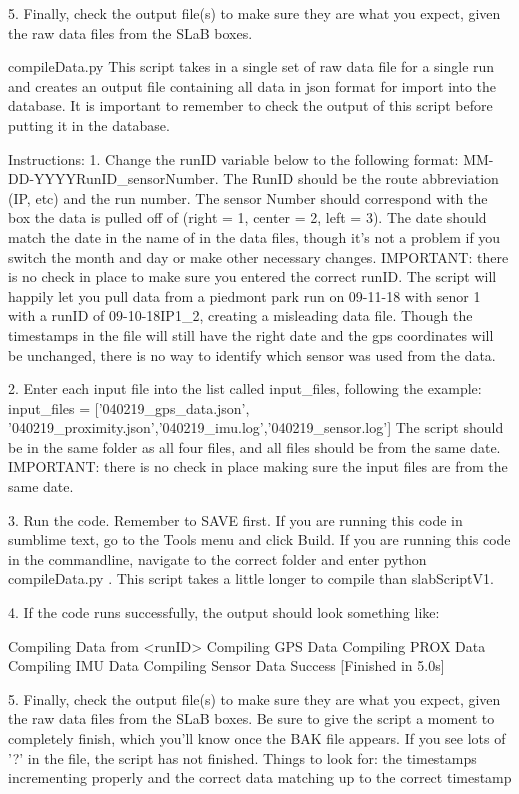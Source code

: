    5. Finally, check the output file(s) to make sure they are what you expect, given the raw data files from the SLaB
      boxes.


compileData.py
This script takes in a single set of raw data file for a single run and creates an output file containing all data in json format for import into the database. It is important to remember to check the output of this script before putting it in the database. 

Instructions:
  1. Change the runID variable below to the following format: MM-DD-YYYYRunID_sensorNumber. The RunID 
     should be the route abbreviation (IP, etc) and the run number. The sensor Number should correspond with 
     the box the data is pulled off of (right = 1, center = 2, left = 3). The date should match
     the date in the name of in the data files, though it's not a problem if you switch the month and day or make
     other necessary changes. IMPORTANT: there is no check in place to make sure you entered the correct
     runID. The script will happily let you pull data from a piedmont park run on 09-11-18 with senor 1 with a runID 
     of 09-10-18IP1_2, creating a misleading data file. Though the timestamps in the file will still have the 
     right date and the gps coordinates will be unchanged, there is no way to identify which sensor was used from the data.

  2. Enter each input file into the list called input_files, following the example:
      input_files = ['040219_gps_data.json', '040219_proximity.json','040219_imu.log','040219_sensor.log']
     The script should be in the same folder as all four files, and all files should be from the same date.
     IMPORTANT: there is no check in place making sure the input files are from the same date.

  3. Run the code. Remember to SAVE first. If you are running this code in sumblime text, go to the Tools menu and
     click Build. If you are running this code in the commandline, navigate to the correct folder and enter
     python compileData.py . This script takes a little longer to compile than slabScriptV1.

  4. If the code runs successfully, the output should look something like:

           Compiling Data from <runID>
           Compiling GPS Data
           Compiling PROX Data
           Compiling IMU Data
           Compiling Sensor Data
           Success
           [Finished in 5.0s]

  5. Finally, check the output file(s) to make sure they are what you expect, given the raw data files from the SLaB
     boxes. Be sure to give the script a moment to completely finish, which you'll know once the BAK file appears.
     If you see lots of '?' in the file, the script has not finished. Things to look for: the timestamps incrementing 
     properly and the correct data matching up to the correct timestamp

